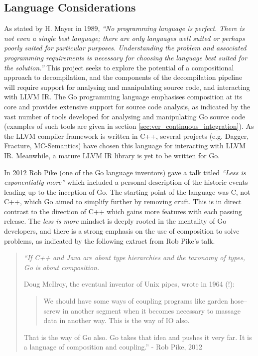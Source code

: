 

\subsection{Language Considerations}

As stated by H. Mayer in 1989, \textit{``No programming language is perfect. There is not even a single best language; there are only languages well suited or perhaps poorly suited for particular purposes. Understanding the problem and associated programming requirements is necessary for choosing the language best suited for the solution.''} \cite{no_perfect_lang_quote} This project seeks to explore the potential of a compositional approach to decompilation, and the components of the decompilation pipeline will require support for analysing and manipulating source code, and interacting with LLVM IR. The Go programming language emphasises composition at its core and provides extensive support for source code analysis, as indicated by the vast number of tools developed for analysing and manipulating Go source code (examples of such tools are given in section \ref{sec:ver_continuous_integration}). As the LLVM compiler framework is written in C++, several projects (e.g. Dagger, Fracture, MC-Semantics) have chosen this language for interacting with LLVM IR. Meanwhile, a mature LLVM IR library is yet to be written for Go.

In 2012 Rob Pike (one of the Go language inventors) gave a talk titled \textit{``Less is exponentially more''} which included a personal description of the historic events leading up to the inception of Go. The starting point of the language was C, not C++, which Go aimed to simplify further by removing cruft. This is in direct contrast to the direction of C++ which gains more features with each passing release. The \textit{less is more} mindset is deeply rooted in the mentality of Go developers, and there is a strong emphasis on the use of composition to solve problems, as indicated by the following extract from Rob Pike's talk.

\begin{quote}
	\itshape
	``If C++ and Java are about type hierarchies and the taxonomy of types, Go is about composition.

	Doug McIlroy, the eventual inventor of Unix pipes, wrote in 1964 (!):

	\begin{quote}
		We should have some ways of coupling programs like garden hose--screw in another segment when it becomes necessary to massage data in another way. This is the way of IO also.
	\end{quote}

	That is the way of Go also. Go takes that idea and pushes it very far. It is a language of composition and coupling.''
	\normalfont
	- Rob Pike, 2012 \cite{less_is_more}
\end{quote}

